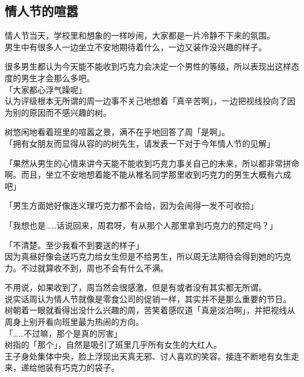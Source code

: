 \subsection{情人节的喧嚣}

情人节当天，学校里和想象的一样吵闹，大家都是一片冷静不下来的氛围。\\

男生中有很多人一边坐立不安地期待着什么，一边又装作没兴趣的样子。

很多男生都认为今天能不能收到巧克力会决定一个男性的等级，所以表现出这样态度的男生才会那么多吧。\\

「大家都心浮气躁呢」\\

认为评级根本无所谓的周一边事不关己地想着「真辛苦啊」，一边把视线投向了因为别的原因而不感兴趣的树。

树悠闲地看着班里的喧嚣之景，满不在乎地回答了周「是啊」。\\

「拥有女朋友而显得从容的的树先生，请发表一下对于今年情人节的见解」

「果然从男生的心情来讲今天能不能收到巧克力事关自己的未来，所以都非常拼命啊。而且，坐立不安地想着能不能从椎名同学那里收到巧克力的男生大概有六成吧」

「男生方面她好像连义理巧克力都不会给，因为会闹得一发不可收拾」

「我想也是……话说回来，周君呀，有从那个人那里拿到巧克力的预定吗？」

「不清楚。至少我看不到要送的样子」\\

因为真昼好像会送巧克力给女生但是不给男生，所以周无法期待会得到她的巧克力。不过就算收不到，周也不会有什么不满。

不用说，如果收到了，周当然会很感激，但是有或者没有其实都无所谓。\\

说实话周认为情人节就像是零食公司的促销一样，其实并不是那么重要的节日。\\

树朝着一眼就看得出没什么兴趣的周，苦笑着感叹道「真是淡泊啊」，并把视线从周身上别开看向班里最为热闹的方向。\\

「……不过嘛，那个是真的厉害」\\

树指的「那个」，自然是吸引了班里几乎所有女生的大红人。\\

王子身处集体中央，脸上浮现出天真无邪、讨人喜欢的笑容。接连不断地有女生走来，递给他装有巧克力的袋子。

